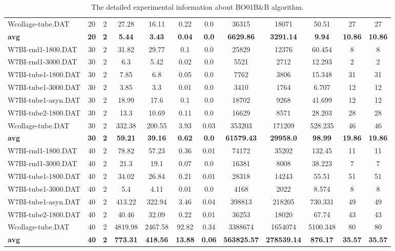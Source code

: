 \begin{table}[!h]
{\begin{tabular}{lccccccccccc}
Wcollage-tube.DAT & 20 & 2 & 27.28 & 16.11 & 0.22 & 0.0 & 36315 & 18071 & 50.51 & 27 & 27\\
\cline{1-12} \textbf{avg} & \textbf{20} & \textbf{2} & \textbf{5.44} & \textbf{3.43} & \textbf{0.04} & \textbf{0.0} & \textbf{6629.86} & \textbf{3291.14} & \textbf{9.94} & \textbf{10.86} & \textbf{10.86} \\ \cline{1-12}
W7BI-rnd1-1800.DAT & 30 & 2 & 31.82 & 29.77 & 0.1 & 0.0 & 25829 & 12376 & 60.454 & 8 & 8\\
W7BI-rnd1-3000.DAT & 30 & 2 & 6.3 & 5.42 & 0.02 & 0.0 & 5521 & 2712 & 12.293 & 2 & 2\\
W7BI-tube1-1800.DAT & 30 & 2 & 7.85 & 6.8 & 0.05 & 0.0 & 7762 & 3806 & 15.348 & 31 & 31\\
W7BI-tube1-3000.DAT & 30 & 2 & 3.85 & 3.3 & 0.01 & 0.0 & 3410 & 1764 & 6.707 & 12 & 12\\
W7BI-tube1-asyn.DAT & 30 & 2 & 18.99 & 17.6 & 0.1 & 0.0 & 18702 & 9268 & 41.699 & 12 & 12\\
W7BI-tube2-1800.DAT & 30 & 2 & 13.3 & 10.69 & 0.11 & 0.0 & 16629 & 8571 & 28.203 & 28 & 28\\
Wcollage-tube.DAT & 30 & 2 & 332.38 & 200.55 & 3.93 & 0.03 & 353203 & 171209 & 528.235 & 46 & 46\\
\cline{1-12} \textbf{avg} & \textbf{30} & \textbf{2} & \textbf{59.21} & \textbf{39.16} & \textbf{0.62} & \textbf{0.0} & \textbf{61579.43} & \textbf{29958.0} & \textbf{98.99} & \textbf{19.86} & \textbf{19.86} \\ \cline{1-12}
W7BI-rnd1-1800.DAT & 40 & 2 & 78.82 & 57.23 & 0.36 & 0.01 & 74172 & 35202 & 132.45 & 11 & 11\\
W7BI-rnd1-3000.DAT & 40 & 2 & 21.3 & 19.1 & 0.07 & 0.0 & 16381 & 8008 & 38.223 & 7 & 7\\
W7BI-tube1-1800.DAT & 40 & 2 & 34.02 & 26.84 & 0.21 & 0.01 & 28318 & 14243 & 55.51 & 51 & 51\\
W7BI-tube1-3000.DAT & 40 & 2 & 5.4 & 4.11 & 0.01 & 0.0 & 4168 & 2022 & 8.574 & 8 & 8\\
W7BI-tube1-asyn.DAT & 40 & 2 & 413.22 & 322.94 & 3.46 & 0.04 & 398813 & 218205 & 730.331 & 49 & 49\\
W7BI-tube2-1800.DAT & 40 & 2 & 40.46 & 32.09 & 0.22 & 0.01 & 36253 & 18020 & 67.74 & 43 & 43\\
Wcollage-tube.DAT & 40 & 2 & 4819.98 & 2467.58 & 92.82 & 0.34 & 3388674 & 1654074 & 5100.348 & 80 & 80\\
\cline{1-12} \textbf{avg} & \textbf{40} & \textbf{2} & \textbf{773.31} & \textbf{418.56} & \textbf{13.88} & \textbf{0.06} & \textbf{563825.57} & \textbf{278539.14} & \textbf{876.17} & \textbf{35.57} & \textbf{35.57} \\ \cline{1-12}
\bottomrule
\end{tabular}%
}%
\caption{The detailed experimental information about BO01B\&B algorithm.}
\label{tab:table_bb}
\end{table}

